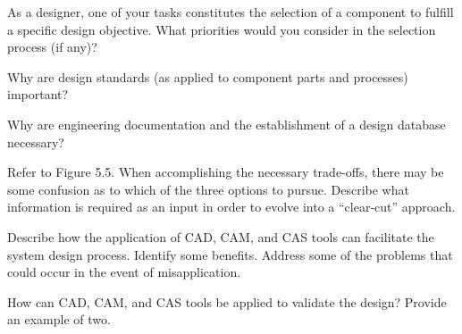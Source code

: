 \begin{exercises}
    \begin{exercise}
    \label{sea-05-06}
        As a designer, one of your tasks constitutes the selection of a component to fulfill a specific design objective. What priorities would you consider in the selection process (if any)?
    \end{exercise}
    \begin{solution}
    \end{solution}
    
    \begin{exercise}
    \label{sea-05-07}
        Why are design standards (as applied to component parts and processes) important?
    \end{exercise}
    \begin{solution}
    \end{solution}
    
    \begin{exercise}
    \label{sea-05-08}
        Why are engineering documentation and the establishment of a design database necessary?
    \end{exercise}
    \begin{solution}
    \end{solution}
    
    \begin{exercise}
    \label{sea-05-09}
        Refer to Figure 5.5. When accomplishing the necessary trade-offs, there may be some confusion as to which of the three options to pursue. Describe what information is required as an input in order to evolve into a “clear-cut” approach.
    \end{exercise}
    \begin{solution}
    \end{solution}
    
    \begin{exercise}
    \label{sea-05-10}
        Describe how the application of CAD, CAM, and CAS tools can facilitate the system design process. Identify some benefits. Address some of the problems that could occur in the event of misapplication.
    \end{exercise}
    \begin{solution}
    \end{solution}
    
    \begin{exercise}
    \label{sea-05-11}
        How can CAD, CAM, and CAS tools be applied to validate the design? Provide an example of two.
    \end{exercise}
    \begin{solution}
    \end{solution}
    

\end{exercises}
